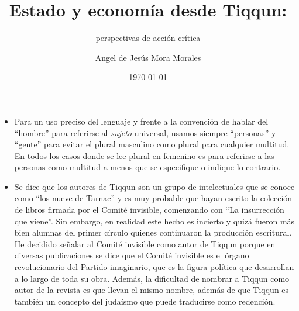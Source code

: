 \documentclass{scrbook}
\title{Estado y economía desde Tiqqun:}
\subtitle{perspectivas de acción crítica}
\author{Angel de Jesús Mora Morales}
\date{\today}
\begin{document}
\frontmatter
\maketitle


\begin{itemize}
\item
  Para un uso preciso del lenguaje y frente a la convención de hablar
  del ``hombre'' para referirse al \emph{sujeto} universal, usamos
  siempre ``personas'' y ``gente'' para evitar el plural masculino como
  plural para cualquier multitud. En todos los casos donde se lee plural
  en femenino es para referirse a las personas como multitud a menos que
  se especifique o indique lo contrario.
\item
  Se dice que los autores de Tiqqun son un grupo de intelectuales que se
  conoce como ``los nueve de Tarnac'' y es muy probable que hayan
  escrito la colección de libros firmada por el Comité invisible,
  comenzando con ``La insurrección que viene''. Sin embargo, en realidad
  este hecho es incierto y quizá fueron más bien alumnas del primer
  círculo quienes continuaron la producción escritural. He decidido
  señalar al Comité invisible como autor de Tiqqun porque en diversas
  publicaciones se dice que el Comité invisible es el órgano
  revolucionario del Partido imaginario, que es la figura política que
  desarrollan a lo largo de toda su obra. Además, la dificultad de
  nombrar a Tiqqun como autor de la revista es que llevan el mismo
  nombre, además de que Tiqqun es también un concepto del judaísmo que
  puede traducirse como redención.
\end{itemize}

\end{document}
